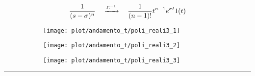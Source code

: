 \documentclass[../main.tex]{subfiles}
\begin{document}
	\begin{figure}[h!]
		\[ \frac{1}{(s-\sigma)^n} \quad \xrightarrow{\mathcal{L}^{-1}} \quad \frac{1}{(n-1)!} t^{n-1} e^{\sigma t} 1(t) \]
		\centering
		\begin{subfigure}{0.3\textwidth}
			\texttt{[image: plot/andamento\_t/poli\_reali3\_1]}
		\end{subfigure}
		\begin{subfigure}{0.3\textwidth}
			\texttt{[image: plot/andamento\_t/poli\_reali3\_2]}
		\end{subfigure}
		\begin{subfigure}{0.3\textwidth}
			\texttt{[image: plot/andamento\_t/poli\_reali3\_3]}
		\end{subfigure}
	\end{figure}
	\newpage
	\noindent
	\rule{\linewidth}{0.4pt}\\%
\end{document}
